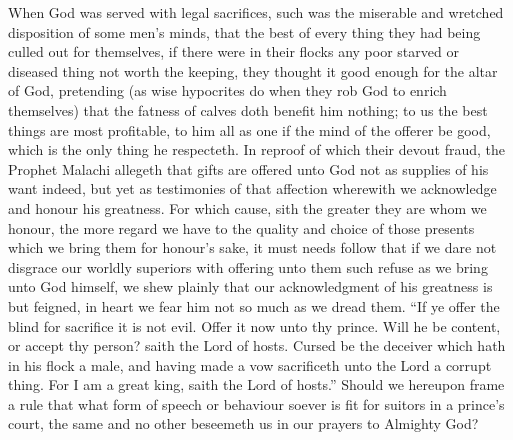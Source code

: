 When God was served with legal sacrifices, such was the miserable and wretched disposition of some men’s minds, that the best of every thing they had being culled out for themselves, if there were in their flocks any poor starved or diseased thing not worth the keeping, they thought it good enough for the altar of God, pretending (as wise hypocrites do when they rob God to enrich themselves) that the fatness of calves doth benefit him nothing; to us the best things are most profitable, to him all as one if the mind of the offerer be good, which is the only thing he respecteth. In reproof of which their devout fraud, the Prophet Malachi allegeth that gifts are offered unto God not as supplies of his want indeed, but yet as testimonies of that affection wherewith we acknowledge and honour his greatness. For which cause, sith the greater they are whom we honour, the more regard we have to the quality and choice of those presents which we bring them for honour’s sake, it must needs follow that if we dare not disgrace our worldly superiors with offering unto them such refuse as we bring unto God himself, we shew plainly that our acknowledgment of his greatness is but feigned, in heart we fear him not so much as we dread them. “If ye offer the blind for sacrifice it is not evil. Offer it now unto  thy prince. Will he be content, or accept thy person? saith the Lord of hosts. Cursed be the deceiver which hath in his flock a male, and having made a vow sacrificeth unto the Lord a corrupt thing. For I am a great king, saith the Lord of hosts.” Should we hereupon frame a rule that what form of speech or behaviour soever is fit for suitors in a prince’s court, the same and no other beseemeth us in our prayers to Almighty God?

